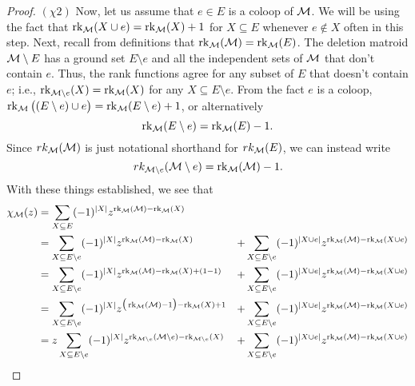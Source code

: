\documentclass[12pt,oneside]{../../sfsuthesis}
\begin{document}
\begin{proof}
    \( (\chi 2 ) \) Now, let us assume that \( e \in E \) is a coloop of \( \mathcal{M} \).
    We will be using the fact that \( \operatorname{rk}_{\mathcal{M}}(X \cup e) = \operatorname{rk}_{\mathcal{M}}(X) + 1 \) for \( X \subseteq E \) whenever \( e \notin X \) often in this step.
    Next, recall from definitions that \( \operatorname{rk}_{\mathcal{M}}(\mathcal{M}) = \operatorname{rk}_{\mathcal{M}}(E) \).
    The deletion matroid \( \mathcal{M} \setminus E \) has a ground set \( E \setminus e \) and all the independent sets of \( \mathcal{M} \) that don't contain \( e \).
    Thus, the rank functions agree for any subset of \( E \) that doesn't contain \( e \); i.e., \( \operatorname{rk}_{\mathcal{M} \setminus e }(X) = \operatorname{rk}_{\mathcal{M}}(X) \) for any \( X \subseteq E \setminus e \).
    From the fact \( e \) is a coloop, \( \operatorname{rk}_{\mathcal{M}}\big((E \setminus e) \cup e\big) =  \operatorname{rk}_{\mathcal{M}}(E \setminus e) + 1 \), or alternatively
    \[
        \operatorname{rk}_{\mathcal{M}}(E \setminus e) = \operatorname{rk}_{\mathcal{M}}(E) - 1.
    \]
    Since \( rk_{\mathcal{M}} ( \mathcal{M} ) \) is just notational shorthand for \( rk_{\mathcal{M} } ( E ) \), we can instead write
    \[
        rk_{\mathcal{M} \setminus e} ( \mathcal{M} \setminus e) = \operatorname{rk}_{\mathcal{M}}({\mathcal{M}}) - 1.
    \]
    With these things established, we see that
    \begin{align*}
        \chi_\cM(z) & = \sum_{X \subseteq E} (-1)^{|X|} z^{\rk_\cM(\cM) - \rk_\cM(X)}                                                      &   &                                                                                                                     \\
                    & = \sum_{X \subseteq E \setminus e} (-1)^{|X|} z^{\rk_\cM(\cM) - \rk_\cM(X)}                                          & + & \sum_{X \subseteq E \setminus e} (-1)^{|X \cup e|} z^{\rk_\cM(\cM) - \rk_\cM(X \cup e)}                             \\
                    & = \sum_{X \subseteq E \setminus e} (-1)^{|X|} z^{\rk_\cM(\cM) - \rk_\cM(X) + ( 1 - 1)}                               & + & \sum_{X \subseteq E \setminus e} (-1)^{|X \cup e|} z^{\rk_\cM(\cM) - \rk_\cM(X \cup e)}                             \\
                    & = \sum_{X \subseteq E \setminus e} (-1)^{|X|} z^{\big( \rk_\cM(\cM) - 1 \big) - \rk_\cM(X) + 1 }                     & + & \sum_{X \subseteq E \setminus e} (-1)^{|X \cup e|} z^{\rk_\cM(\cM) - \rk_\cM(X \cup e)}                             \\
                    & = z\sum_{X \subseteq E \setminus e} (-1)^{|X|} z^{\rk_{\cM \setminus e}(\cM \setminus e) - \rk_{\cM \setminus e}(X)} & + & \sum_{X \subseteq E \setminus e} (-1)^{|X \cup e|} z^{\rk_\cM(\cM) - \rk_\cM(X \cup e)}                             \\

\end{align*}
\end{proof}
\end{document}
